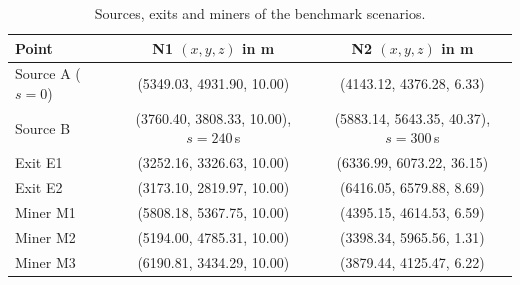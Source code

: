 \documentclass[11pt,a4paper]{article}
\theoremstyle{plain}
\theoremstyle{definition}
\theoremstyle{remark}
\begin{document}
\begin{table}[htbp]
  \centering\small
  \begin{tabular}{@{}l c c@{}}
    \toprule
    Point & N1 $(x, y, z)$ in m & N2 $(x, y, z)$ in m \\
    \midrule
    Source A ($s = 0$)   & (5349.03, 4931.90, 10.00) & (4143.12, 4376.28, 6.33) \\
    Source B             & (3760.40, 3808.33, 10.00), $s = 240$\,s & (5883.14, 5643.35, 40.37), $s = 300$\,s \\
    Exit E1              & (3252.16, 3326.63, 10.00) & (6336.99, 6073.22, 36.15) \\
    Exit E2              & (3173.10, 2819.97, 10.00) & (6416.05, 6579.88, 8.69) \\
    Miner M1             & (5808.18, 5367.75, 10.00) & (4395.15, 4614.53, 6.59) \\
    Miner M2             & (5194.00, 4785.31, 10.00) & (3398.34, 5965.56, 1.31) \\
    Miner M3             & (6190.81, 3434.29, 10.00) & (3879.44, 4125.47, 6.22) \\
    \bottomrule
  \end{tabular}
  \caption{Sources, exits and miners of the benchmark scenarios.}
  \label{tab:coords}
\end{table}
\end{document}

